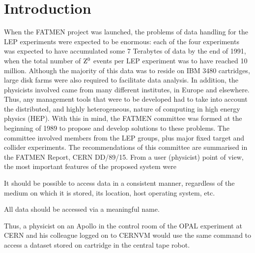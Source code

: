 \chapter{Introduction}

When the FATMEN project was launched,
the problems of data handling for the LEP experiments were expected
to be enormous: each of the four experiments was expected to
have accumulated some 7 Terabytes of data by the end of 1991,
when the total number of $\rm Z^0$ events per
LEP experiment was to have reached 10 million\cite{bib-MUSCLE}.
Although
the majority of this data was to reside on IBM 3480 cartridges, large disk
farms were also required to facilitate data analysis. In addition,
the physicists involved came from many different institutes,
in Europe and elsewhere.
Thus, any management
tools that were to be developed had to take into account the 
distributed, and highly
heterogeneous, nature of computing in high energy physics (HEP).
With this in mind,
the FATMEN committee was formed at the beginning of 1989
to propose and develop solutions to these problems.
The committee involved members from the LEP groups,
plus major fixed target and collider experiments.
The recommendations of this committee are summarised in the
FATMEN Report, CERN DD/89/15.
From a user (physicist) point of view, the most important
features of the proposed system were
\begin{UL}
\item It should be possible to access data in a consistent manner,
regardless of the medium on which it is stored,
its location, host operating system, etc.
\item All data should be accessed via a meaningful name.
\end{UL}
\par
Thus, a physicist on an Apollo in the control room
of the OPAL experiment at CERN
and his
colleague logged on to CERNVM would use the same command to
access a dataset stored on cartridge in the central tape robot.

